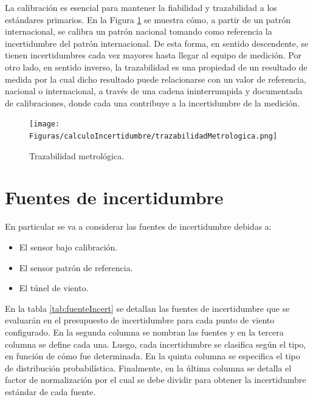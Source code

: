 La calibración es esencial para mantener la fiabilidad y trazabilidad a los estándares primarios. En la Figura \ref{fig:trazabilidadMetrologica} se muestra cómo, a partir de un patrón internacional, se calibra un patrón nacional tomando como referencia la incertidumbre del patrón internacional. De esta forma, en sentido descendente, se tienen incertidumbres cada vez mayores hasta llegar al equipo de medición. Por otro lado, en sentido inverso, la trazabilidad es una propiedad de un resultado de medida por la cual dicho resultado puede relacionarse con un valor de referencia, nacional o internacional, a través de una cadena ininterrumpida y documentada de calibraciones, donde cada una contribuye a la incertidumbre de la medición.

\begin{figure}[H]
    \centering
    \texttt{[image: Figuras/calculoIncertidumbre/trazabilidadMetrologica.png]}
    \caption{Trazabilidad metrológica.}
    \label{fig:trazabilidadMetrologica}
\end{figure}

\section{Fuentes de incertidumbre}\label{sec:fuentesDeIncertidumbre}
En particular se va a considerar las fuentes de incertidumbre debidas a:
\begin{itemize}
    \item El sensor bajo calibración.
    \item El sensor patrón de referencia.
    \item El túnel de viento.
\end{itemize}

En la tabla \ref{tab:fuenteIncert} se detallan las fuentes de incertidumbre que se evaluarán en el presupuesto de incertidumbre para cada punto de viento configurado. En la segunda columna se nombran las fuentes y en la tercera columna se define cada una. Luego, cada incertidumbre se clasifica según el tipo, en función de cómo fue determinada. En la quinta columna se especifica el tipo de distribución probabilística. Finalmente, en la última columna se detalla el factor de normalización por el cual se debe dividir para obtener la incertidumbre estándar de cada fuente.

